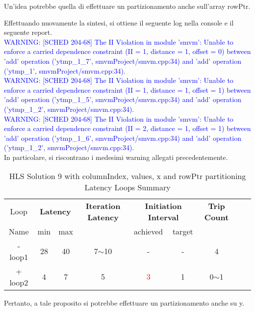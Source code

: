 Un'idea potrebbe quella di effettuare un partizionamento anche sull'array rowPtr.



Effettuando nuovamente la sintesi, si ottiene il seguente log nella console e il seguente report.
\\
\textcolor{blue}{WARNING: [SCHED 204-68] The II Violation in module 'smvm': Unable to enforce a carried dependence constraint (II = 1, distance = 1, offset = 0)
	between 'add' operation ('ytmp\_1\_7', smvmProject/smvm.cpp:34) and 'add' operation ('ytmp\_1', smvmProject/smvm.cpp:34).}
\\
\textcolor{blue}{WARNING: [SCHED 204-68] The II Violation in module 'smvm': Unable to enforce a carried dependence constraint (II = 1, distance = 1, offset = 1)
	between 'add' operation ('ytmp\_1\_5', smvmProject/smvm.cpp:34) and 'add' operation ('ytmp\_1\_2', smvmProject/smvm.cpp:34).}
\\
\textcolor{blue}{WARNING: [SCHED 204-68] The II Violation in module 'smvm': Unable to enforce a carried dependence constraint (II = 2, distance = 1, offset = 1)
	between 'add' operation ('ytmp\_1\_6', smvmProject/smvm.cpp:34) and 'add' operation ('ytmp\_1\_2', smvmProject/smvm.cpp:34).}
\\
In particolare, si riscontrano i medesimi warning allegati precedentemente.

\begin{table}[H]
	\centering
	\begin{tabular}{|c|c|c|c|c|c|c|c|c|}
		\hline
		\multicolumn{1}{|c|}{Loop} & \multicolumn{2}{|c|}{\textbf{Latency}} & \multicolumn{1}{c|}{\textbf{Iteration Latency}} & \multicolumn{2}{c|}{\textbf{Initiation Interval}} & \multicolumn{1}{c|}{\textbf{Trip Count}}  \\
		Name & min & max &  & achieved & target &  \\
		\hline
		- loop1 & 28 & 40 & 7$\sim$10 & - & - & 4 \\
		+ loop2 & 4 & 7 & 5 & \textcolor{red}{3} & 1 & 0$\sim$1 \\
		\hline
	\end{tabular}
	\caption{HLS Solution 9 with columnIndex, values, x and rowPtr partitioning Latency Loops Summary}
	\label{tab:hls-solution-9-columnindex-values-partitioning-loop-summary}
\end{table}

Pertanto, a tale proposito si potrebbe effettuare un partizionamento anche su y.

